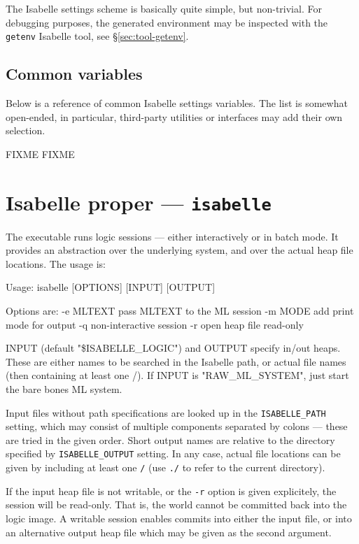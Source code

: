 \medskip The Isabelle settings scheme is basically quite simple, but
non-trivial.  For debugging purposes, the generated environment may be
inspected with the \texttt{getenv} Isabelle tool, see
\S\ref{sec:tool-getenv}.


\subsection{Common variables}

Below is a reference of common Isabelle settings variables. The list
is somewhat open-ended, in particular, third-party utilities or
interfaces may add their own selection.

\begin{ttdescription}
\item[FIXME] FIXME
\end{ttdescription}


\section{Isabelle proper --- \texttt{isabelle}}

The  executable runs logic sessions --- either
interactively or in batch mode. It provides an abstraction over the
underlying {\ML} system, and over the actual heap file locations. The usage is:
\begin{ttbox}
Usage: isabelle [OPTIONS] [INPUT] [OUTPUT]

  Options are:
    -e MLTEXT    pass MLTEXT to the ML session
    -m MODE      add print mode for output
    -q           non-interactive session
    -r           open heap file read-only

  INPUT (default "\$ISABELLE_LOGIC") and OUTPUT specify in/out heaps.
  These are either names to be searched in the Isabelle path, or actual
  file names (then containing at least one /).
  If INPUT is "RAW_ML_SYSTEM", just start the bare bones ML system.
\end{ttbox}
Input files without path specifications are looked up in the
\texttt{ISABELLE_PATH} setting, which may consist of multiple
components separated by colons --- these are tried in the given order.
Short output names are relative to the directory specified by
\texttt{ISABELLE_OUTPUT} setting.  In any case, actual file locations
can be given by including at least one \texttt{/} (use \texttt{./} to
refer to the current directory).

If the input heap file is not writable, or the \texttt{-r} option is
given explicitely, the session will be read-only. That is, the {\ML}
world cannot be committed back into the logic image.  A writable
session enables commits into either the input file, or into an
alternative output heap file which may be given as the second
argument.

